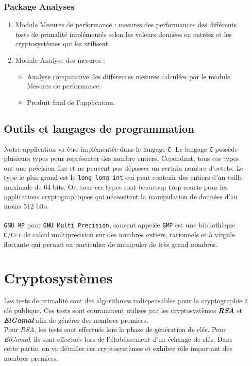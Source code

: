 				\subsubsection*{Package Analyses}
				\begin{enumerate}[leftmargin=*]
					\item Module Mesures de performance : mesures des performances des différents tests de primalité implémentés selon les valeurs données en entrées et les cryptosystèmes qui les utilisent.
					\item Module Analyse des mesures :
					\begin{itemize}[leftmargin=0.2cm]
						\item Analyse comparative des différentes mesures calculées par le module Mesures de performance.
						\item Produit final de l'application.
					\end{itemize}
				\end{enumerate}
		
		\subsection{Outils et langages de programmation}
		Notre application va être implémentée dans le langage \lstinline!C!. Le langage \lstinline!C! possède plusieurs types pour représenter des nombre entiers. Cependant, tous ces types ont une précision fixe et ne peuvent pas dépasser un certain nombre d'octets. Le type le plus grand est le \lstinline!long long int! qui peut contenir des entiers d'un taille maximale de 64 bits. Or, tous ces types sont beaucoup trop courts pour les applications cryptographiques qui nécessitent la manipulation de données d'au moins 512 bits.
		\paragraph{}\lstinline!GNU MP! pour \lstinline!GNU Multi Precision!, souvent appelée \lstinline!GMP! est une bibliothèque \lstinline!C!/\lstinline!C++! de calcul multiprécision sur des nombres entiers, rationnels et à virgule flottante qui permet en particulier de manipuler de très grand nombres.
	
	
	
	\section{Cryptosystèmes}
	
		Les tests de primalité sont des algorithmes indispensables pour la cryptographie à clé publique. Ces tests sont couramment utilisés par les cryptosystèmes \textbf{\textit{RSA}} et \textbf{\textit{ElGamal}} afin de générer des nombres premiers.\\
		Pour \textit{RSA}, les tests sont effectués lors la phase de génération de clés. Pour \textit{ElGamal}, ils sont effectués lors de l'établissement d'un échange de clés.
		Dans cette partie, on va détailler ces cryptosystèmes et exhiber rôle important des nombres premiers.
		
